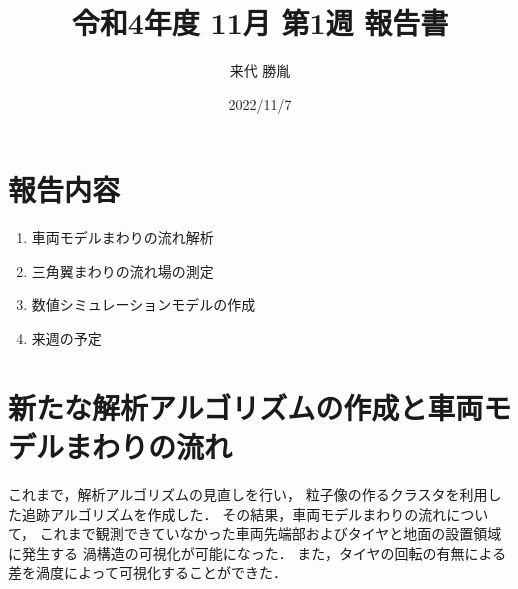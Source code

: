 \documentclass[twocolumn,a4j]{jsarticle}
\author{来代 勝胤}
\title{令和4年度 11月 第1週 報告書}
\date{2022/11/7}
\begin{document}
\columnseprule=0.1mm
\maketitle

\section*{報告内容}
\begin{enumerate}[1.]
  \item 車両モデルまわりの流れ解析
  \item 三角翼まわりの流れ場の測定
  \item 数値シミュレーションモデルの作成
  \item 来週の予定
\end{enumerate}

\section{新たな解析アルゴリズムの作成と車両モデルまわりの流れ}
これまで，解析アルゴリズムの見直しを行い，
粒子像の作るクラスタを利用した追跡アルゴリズムを作成した．
その結果，車両モデルまわりの流れについて，
これまで観測できていなかった車両先端部およびタイヤと地面の設置領域に発生する
渦構造の可視化が可能になった．
また，タイヤの回転の有無による差を渦度によって可視化することができた．\\
\end{document}
